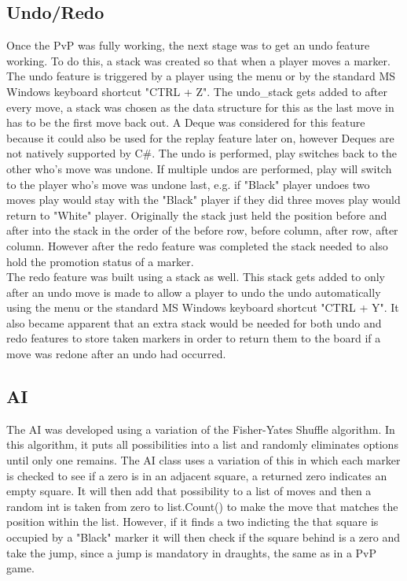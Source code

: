 \documentclass[10pt, a4paper]{article}
\begin{document}
	\subsection{Undo/Redo}
Once the PvP was fully working, the next stage was to get an undo feature working. To do this, a stack was created so that when a player moves a marker. The undo feature is triggered by a player using the menu or by the standard MS Windows keyboard shortcut "CTRL + Z". The undo\_stack gets added to after every move, a stack was chosen as the data structure for this as the last move in has to be the first move back out. A Deque was considered for this feature because it could also be used for the replay feature later on, however Deques are not natively supported by C\#. The undo is performed, play switches back to the other who's move was undone. If multiple undos are performed, play will switch to the player who's move was undone last, e.g. if "Black" player undoes two moves play would stay with the "Black" player if they did three moves play would return to "White" player. Originally the stack just held the position before and after into the stack in the order of the before row, before column, after row, after column. However after the redo feature was completed the stack needed to also hold the promotion status of a marker. 
\\
The redo feature was built using a stack as well. This stack gets added to only after an undo move is made to allow a player to undo the undo automatically using the menu or the standard MS Windows keyboard shortcut "CTRL + Y". It also became apparent that an extra stack would be needed for both undo and redo features to store taken markers in order to return them to the board if a move was redone after an undo had occurred.
	
	\subsection{AI}
The AI was developed using a variation of the Fisher-Yates Shuffle algorithm. In this algorithm, it puts all possibilities into a list and randomly eliminates options until only one remains. The AI class uses a variation of this in which each marker is checked to see if a zero is in an adjacent square, a returned zero indicates an empty square. It will then add that possibility to a list of moves and then a random int is taken from zero to list.Count() to make the move that matches the position within the list. However, if it finds a two indicting the that square is occupied by a "Black" marker it will then check if the square behind is a zero and take the jump, since a jump is mandatory in draughts, the same as in a PvP game.
\end{document}
